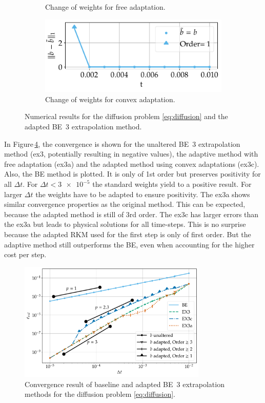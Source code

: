 \documentclass[a4paper]{article}
\numberwithin{equation}{section}
\theoremstyle{plain}
\theoremstyle{definition}
\numberwithin{theorem}{section}
\newcommand{\dt}{{\Delta t}}
\newcommand{\1}{\mathbbm{1}}
\begin{document}
\begin{figure}
\begin{subfigure}[b]{0.45\textwidth}
\caption{Change of weights for free adaptation.}
\label{fig:weights_Diff_a}
\end{subfigure}
\begin{subfigure}[b]{0.45\textwidth}
\centering
\includegraphics[width=1\textwidth]{plots/b_Diff_Convex.pdf}
\caption{Change of weights for convex adaptation.}
\label{fig:weights_Diff_c}
\end{subfigure}
\caption{Numerical results for the diffusion problem \eqref{eq:diffusion} and the
         adapted BE~3 extrapolation method.}
\end{figure}


In Figure\,\ref{fig:conv_impl}, the convergence is shown for the unaltered BE~3 extrapolation method (ex3, potentially resulting in negative values), the adaptive method with free adaptation (ex3a) and the adapted method using convex adaptations (ex3c).
Also, the BE method is plotted. It is only of 1st order but preserves positivity for all $\dt$.
For $\dt < \num{3e-5} $ the standard weights yield to a positive result. For larger $\dt$ the weights have to be adapted to ensure positivity.
The ex3a shows similar convergence properties as the original method.
This can be expected, because the adapted method is still of 3rd order.
The ex3c has larger errors than the ex3a but leads to physical solutions for all time-steps.
This is no surprise because the adapted RKM used for the first step is only of first order.
But the adaptive method still outperforms the BE, even when accounting for the higher cost per step.

\begin{figure}[ht]
\centering
\includegraphics[width=0.8\textwidth]{plots/conv_heat.pdf}
\caption{Convergence result of baseline and adapted BE~3
         extrapolation methods for the diffusion problem \eqref{eq:diffusion}.}
\label{fig:conv_impl}
\end{figure}
\end{document}
